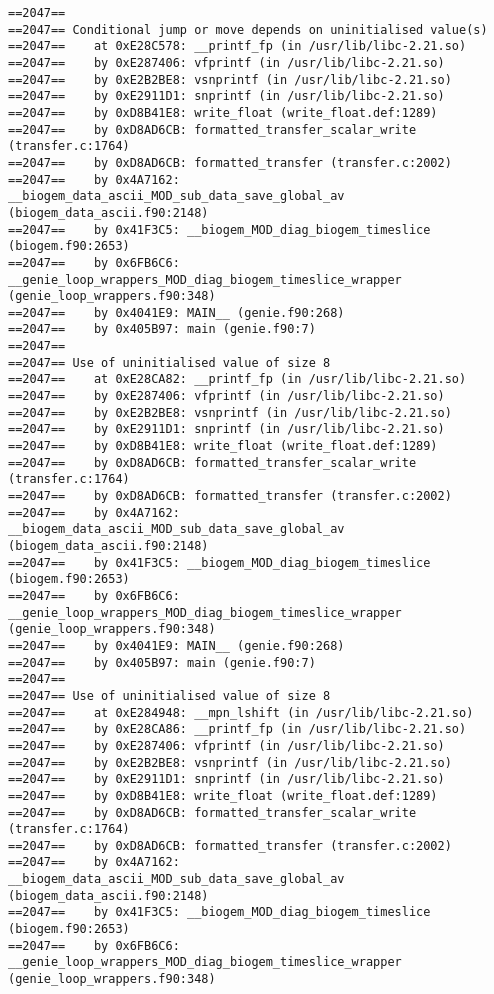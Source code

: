 \documentclass[a4paper,10pt,article]{memoir}
\begin{document}
\begin{verbatim}
==2047==
==2047== Conditional jump or move depends on uninitialised value(s)
==2047==    at 0xE28C578: __printf_fp (in /usr/lib/libc-2.21.so)
==2047==    by 0xE287406: vfprintf (in /usr/lib/libc-2.21.so)
==2047==    by 0xE2B2BE8: vsnprintf (in /usr/lib/libc-2.21.so)
==2047==    by 0xE2911D1: snprintf (in /usr/lib/libc-2.21.so)
==2047==    by 0xD8B41E8: write_float (write_float.def:1289)
==2047==    by 0xD8AD6CB: formatted_transfer_scalar_write (transfer.c:1764)
==2047==    by 0xD8AD6CB: formatted_transfer (transfer.c:2002)
==2047==    by 0x4A7162: __biogem_data_ascii_MOD_sub_data_save_global_av (biogem_data_ascii.f90:2148)
==2047==    by 0x41F3C5: __biogem_MOD_diag_biogem_timeslice (biogem.f90:2653)
==2047==    by 0x6FB6C6: __genie_loop_wrappers_MOD_diag_biogem_timeslice_wrapper (genie_loop_wrappers.f90:348)
==2047==    by 0x4041E9: MAIN__ (genie.f90:268)
==2047==    by 0x405B97: main (genie.f90:7)
==2047==
==2047== Use of uninitialised value of size 8
==2047==    at 0xE28CA82: __printf_fp (in /usr/lib/libc-2.21.so)
==2047==    by 0xE287406: vfprintf (in /usr/lib/libc-2.21.so)
==2047==    by 0xE2B2BE8: vsnprintf (in /usr/lib/libc-2.21.so)
==2047==    by 0xE2911D1: snprintf (in /usr/lib/libc-2.21.so)
==2047==    by 0xD8B41E8: write_float (write_float.def:1289)
==2047==    by 0xD8AD6CB: formatted_transfer_scalar_write (transfer.c:1764)
==2047==    by 0xD8AD6CB: formatted_transfer (transfer.c:2002)
==2047==    by 0x4A7162: __biogem_data_ascii_MOD_sub_data_save_global_av (biogem_data_ascii.f90:2148)
==2047==    by 0x41F3C5: __biogem_MOD_diag_biogem_timeslice (biogem.f90:2653)
==2047==    by 0x6FB6C6: __genie_loop_wrappers_MOD_diag_biogem_timeslice_wrapper (genie_loop_wrappers.f90:348)
==2047==    by 0x4041E9: MAIN__ (genie.f90:268)
==2047==    by 0x405B97: main (genie.f90:7)
==2047==
==2047== Use of uninitialised value of size 8
==2047==    at 0xE284948: __mpn_lshift (in /usr/lib/libc-2.21.so)
==2047==    by 0xE28CA86: __printf_fp (in /usr/lib/libc-2.21.so)
==2047==    by 0xE287406: vfprintf (in /usr/lib/libc-2.21.so)
==2047==    by 0xE2B2BE8: vsnprintf (in /usr/lib/libc-2.21.so)
==2047==    by 0xE2911D1: snprintf (in /usr/lib/libc-2.21.so)
==2047==    by 0xD8B41E8: write_float (write_float.def:1289)
==2047==    by 0xD8AD6CB: formatted_transfer_scalar_write (transfer.c:1764)
==2047==    by 0xD8AD6CB: formatted_transfer (transfer.c:2002)
==2047==    by 0x4A7162: __biogem_data_ascii_MOD_sub_data_save_global_av (biogem_data_ascii.f90:2148)
==2047==    by 0x41F3C5: __biogem_MOD_diag_biogem_timeslice (biogem.f90:2653)
==2047==    by 0x6FB6C6: __genie_loop_wrappers_MOD_diag_biogem_timeslice_wrapper (genie_loop_wrappers.f90:348)

\end{verbatim}
\end{document}
